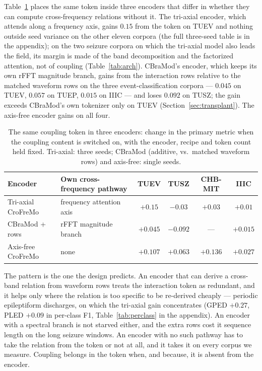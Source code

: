 Table~\ref{tab:content-structure} places the same token inside three
encoders that differ in whether they can compute cross-frequency
relations without it. The tri-axial encoder, which attends along a
frequency axis, gains $0.15$ from the token on TUEV and nothing outside
seed variance on the other eleven corpora (the full three-seed table is in
the appendix); on the two seizure corpora on which the tri-axial model
also leads the field, its margin is made of the band decomposition and
the factorized attention, not of coupling
(Table~\ref{tab:arch}). CBraMod's encoder, which keeps its own rFFT
magnitude branch, gains from the interaction rows relative to the matched
waveform rows on the three event-classification corpora --- $0.045$ on
TUEV, $0.057$ on TUEP, $0.015$ on IIIC --- and loses $0.092$ on TUSZ; the
gain exceeds CBraMod's own tokenizer only on TUEV
(Section~\ref{sec:transplant}). The axis-free encoder gains on all four.

\begin{table}[t]
\centering
\small
\caption{The same coupling token in three encoders: change in the primary
metric when the coupling content is switched on, with the encoder, recipe
and token count held fixed. Tri-axial: three seeds; CBraMod (additive,
vs.\ matched waveform rows) and axis-free: single seeds.}
\label{tab:content-structure}
\begin{tabular}{llcccc}
\toprule
Encoder & Own cross-frequency pathway & TUEV & TUSZ & CHB-MIT & IIIC \\
\midrule
Tri-axial CroFreMo & frequency attention axis & $+0.15$ & $-0.03$ & $+0.03$ & $+0.01$ \\
CBraMod + rows & rFFT magnitude branch & $+0.045$ & $-0.092$ & --- & $+0.015$ \\
Axis-free CroFreMo & none & $+0.107$ & $+0.063$ & $+0.136$ & $+0.027$ \\
\bottomrule
\end{tabular}
\end{table}

The pattern is the one the design predicts. An encoder that can derive a
cross-band relation from waveform rows treats the interaction token as
redundant, and it helps only where the relation is too specific to be
re-derived cheaply --- periodic epileptiform discharges, on which the
tri-axial gain concentrates (GPED $+0.27$, PLED $+0.09$ in per-class F1,
Table~\ref{tab:perclass} in the appendix). An encoder with a spectral
branch is not starved either, and the extra rows cost it sequence length
on the long seizure windows. An encoder with no such pathway has to take
the relation from the token or not at all, and it takes it on every
corpus we measure. Coupling belongs in the token when, and because, it is
absent from the encoder.

